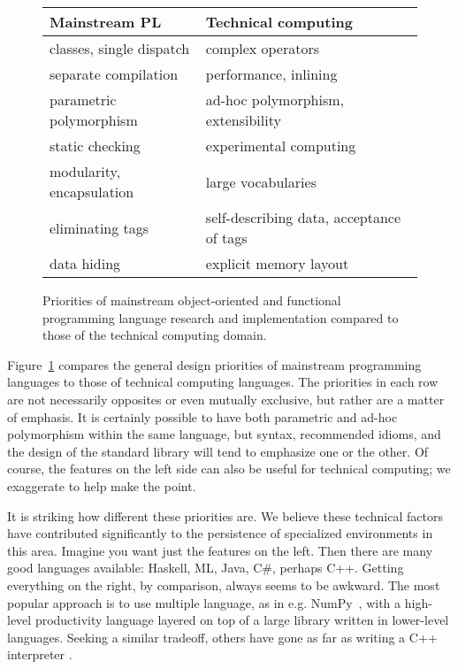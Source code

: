 \begin{figure}
  \begin{center}
    \def\arraystretch{1.25}
    \begin{tabular}{|l|l|}\hline
      \textbf{Mainstream PL} & \textbf{Technical computing} \\
      \hline \hline
      classes, single dispatch             &  complex operators \\
      \hline
      separate compilation                 &  performance, inlining \\
      \hline
      parametric polymorphism              &  ad-hoc polymorphism, extensibility \\
      \hline
      static checking                      &  experimental computing \\
      \hline
      modularity, encapsulation            &  large vocabularies \\
      \hline
      eliminating tags                     &  self-describing data, acceptance of tags \\
      \hline
      data hiding                          &  explicit memory layout \\
      \hline
    \end{tabular}
  \end{center}
  \caption{
    Priorities of mainstream object-oriented and functional programming language research and
    implementation compared to those of the technical computing domain.
  }
  \label{PLpriorities}
\end{figure}

Figure~\ref{PLpriorities} compares the general design priorities of mainstream programming
languages to those of technical computing languages. The priorities in each row are not
necessarily opposites or even mutually exclusive, but rather are a matter of emphasis.
It is certainly possible to have both parametric and ad-hoc polymorphism within
the same language, but syntax, recommended idioms, and the design of the standard library will
tend to emphasize one or the other. Of course, the features on the left side can
also be useful for technical computing; we exaggerate to help make the point.

It is striking how different these priorities are. We believe these technical factors have
contributed significantly to the persistence of specialized environments in this area.
Imagine you want just the features on the left. Then there are many good
languages available: Haskell, ML, Java, C\#, perhaps C++.
Getting everything on the right, by comparison, always seems to be awkward.
The most popular approach is to use multiple language, as in e.g. NumPy~\cite{numpy},
with a high-level productivity language layered on top of a large library
written in lower-level languages. Seeking a similar tradeoff,
others have gone as far as writing a C++ interpreter \cite{vasilev2012cling}.



